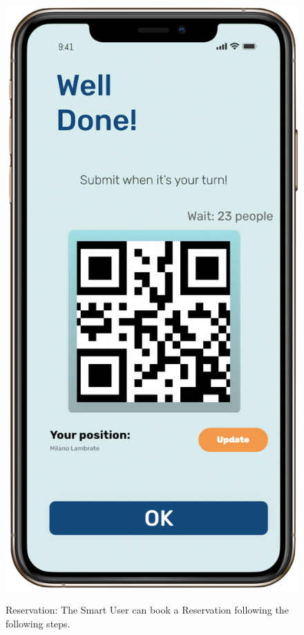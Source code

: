 \begin{figure}[H]
\begin{center}
{            \includegraphics[scale=0.30]{images/mockup/qrcode_reservation_done.png}
        }
%
    \end{center}
    \caption{Reservation: The Smart User can book a Reservation following the following steps.}
   \label{fig:subfigures}
\end{figure}

